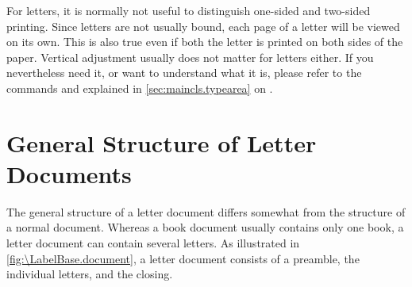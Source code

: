 



For letters, it is normally not useful to distinguish one-sided and two-sided
printing. Since letters are not usually bound, each page of a letter will be
viewed on its own. This is also true even if both the letter is printed on
both sides of the paper. Vertical adjustment usually does not matter for
letters either. If you nevertheless need it, or want to understand what it is,
please refer to the commands  and 
explained in \autoref{sec:maincls.typearea} on
.%
%
\EndIndexGroup


\section{General Structure of Letter Documents}
\BeginIndexGroup
{}

The general structure of a letter document differs somewhat from the structure
of a normal document. Whereas a book document usually contains only one book,
a letter document can contain several letters. As illustrated in
\autoref{fig:\LabelBase.document}, a letter document consists of a preamble,
the individual letters, and the closing.

